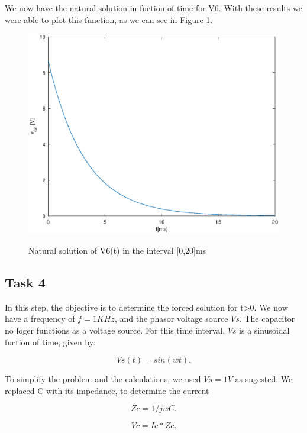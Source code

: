 \par We now have the natural solution in fuction of time for V6. With these results we were able to plot this function, as we can see in Figure \ref{fig:g_3}.

\begin{figure}[h] \centering
 \caption{Natural solution of V6(t) in the interval [0,20]ms}
 \includegraphics[width=0.8\linewidth]{natural_solution.eps}
 \label{fig:g_3}
\end{figure}
 
\subsection{Task 4}

\par In this step, the objective is to determine the forced solution for t>0. We now have a frequency of $f = 1KHz$, and the phasor voltage source $Vs$. The capacitor no loger functions as a voltage source. For this time interval, $Vs$ is a sinusoidal fuction of time, given by:

\begin{equation}
  Vs(t) = sin(wt).
\end{equation}

\par To simplify the problem and the calculations, we used $Vs=1V$ as sugested. We replaced C with its impedance, to determine the current

\begin{equation}
  Zc = 1/jwC.
\end{equation}

\begin{equation}
  Vc = Ic*Zc.
\end{equation}

